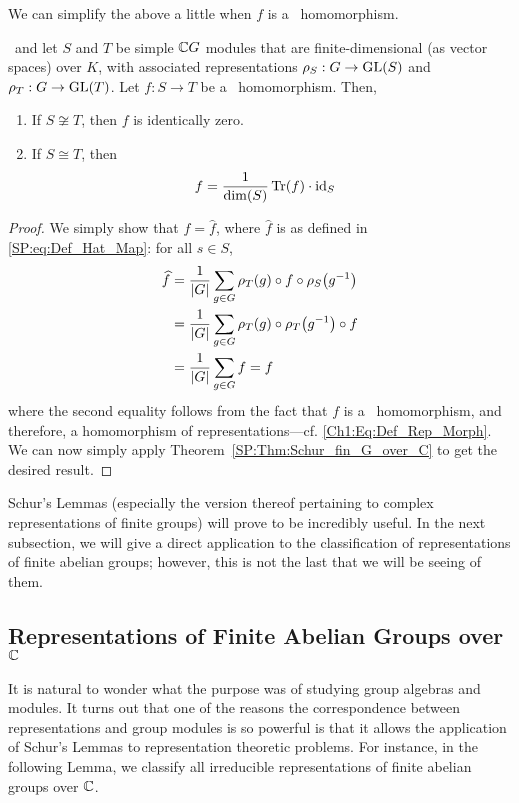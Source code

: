 We can simplify the above a little when $f$ is a \CGM\ homomorphism.
\begin{corollary}\label{SP:Cor:Schur_fin_G_over_C_Morhp_Ver}
    \ and let $S$ and $T$ be simple $\mathbb{C} G$ modules that are finite-dimensional (as vector spaces) over $K$, with associated representations $\rho_S : G \to \operatorname{GL}\!\left( S \right)$ and $\rho_T : G \to \operatorname{GL}\!\left( T \right)$. Let $f : S \to T$ be a \CGM\ homomorphism. Then,
    \begin{enumerate}[label = \normalfont \arabic*.]
        \item If $S \not\cong T$, then $f$ is identically zero.
        \item If $S \cong T$, then
        \begin{align*}
            f &= \frac{1}{\dim\!\left( S \right)} \operatorname{Tr}\!\left( f \right) \cdot \operatorname{id}_S
        \end{align*}
    \end{enumerate}
\end{corollary}
\begin{proof}
    We simply show that $f = \hat{f}$, where $\hat{f}$ is as defined in \eqref{SP:eq:Def_Hat_Map}: for all $s \in S$,
    \begin{align*}
        \widehat{f} &= \frac{1}{\left\lvert G \right\rvert} \sum_{g \in G} \rho_T(g) \circ f \circ \rho_S\!\left( g^{-1} \right) \\
        &= \frac{1}{\left\lvert G \right\rvert} \sum_{g \in G} \rho_T(g) \circ \rho_T\!\left( g^{-1} \right) \circ f \\
        &= \frac{1}{\left\lvert G \right\rvert} \sum_{g \in G} f = f
    \end{align*}
    where the second equality follows from the fact that $f$ is a \CGM\ homomorphism, and therefore, a homomorphism of representations---cf. \eqref{Ch1:Eq:Def_Rep_Morph}. We can now simply apply Theorem~\ref{SP:Thm:Schur_fin_G_over_C} to get the desired result.
\end{proof}

Schur's Lemmas (especially the version thereof pertaining to complex representations of finite groups) will prove to be incredibly useful. In the next subsection, we will give a direct application to the classification of representations of finite abelian groups; however, this is not the last that we will be seeing of them.

\subsection{Representations of Finite Abelian Groups over $\mathbb{C}$}

It is natural to wonder what the purpose was of studying group algebras and modules. It turns out that one of the reasons the correspondence between representations and group modules is so powerful is that it allows the application of Schur's Lemmas to representation theoretic problems. For instance, in the following Lemma, we classify all irreducible representations of finite abelian groups over $\mathbb{C}$.

